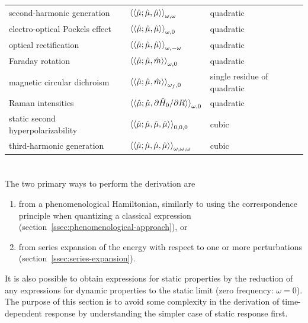 \documentclass[%
class = book,%
crop = false,%
float = true,%
multi = true,%
preview = false,%
]{standalone}
\begin{document}
\begin{table}
\begin{tabular}{lll}
    second-harmonic generation        & \( \braket{\braket{\hat{\mu};\hat{\mu},\hat{\mu}}}_{\omega,\omega} \)                  & quadratic \\
    electro-optical Pockels effect    & \( \braket{\braket{\hat{\mu};\hat{\mu},\hat{\mu}}}_{\omega,0} \)                       & quadratic \\
    optical rectification             & \( \braket{\braket{\hat{\mu};\hat{\mu},\hat{\mu}}}_{\omega,-\omega} \)                 & quadratic \\
    Faraday rotation                  & \( \braket{\braket{\hat{\mu};\hat{\mu},\hat{m}}}_{\omega,0} \)                         & quadratic \\
    magnetic circular dichroism       & \( \braket{\braket{\hat{\mu};\hat{\mu},\hat{m}}}_{\omega_{f},0} \)                     & single residue of quadratic \\
    Raman intensities                 & \( \braket{\braket{\hat{\mu};\hat{\mu},\partial\hat{H}_{0}/\partial R}}_{\omega,0} \)  & quadratic \\
    \midrule
    static second hyperpolarizability & \( \braket{\braket{\hat{\mu};\hat{\mu},\hat{\mu},\hat{\mu}}}_{0,0,0} \)                & cubic \\
    third-harmonic generation         & \( \braket{\braket{\hat{\mu};\hat{\mu},\hat{\mu},\hat{\mu}}}_{\omega,\omega,\omega} \) & cubic \\
    \bottomrule
  \end{tabular}
\end{table}

\section{\texorpdfstring{}{Static (time-independent) response properties}}
\label{sec:static-properties}

The two primary ways to perform the derivation are
\begin{enumerate}
\item from a phenomenological Hamiltonian, similarly to using the correspondence principle when quantizing a classical expression (section~\ref{ssec:phenomenological-approach}), or
\item from series expansion of the energy with respect to one or more perturbations (section~\ref{ssec:series-expansion}).
\end{enumerate}
It is also possible to obtain expressions for static properties by the reduction of any expressions for dynamic properties to the static limit (zero frequency: \(\omega = 0\)). The purpose of this section is to avoid some complexity in the derivation of time-dependent response by understanding the simpler case of static response first.
\end{document}
